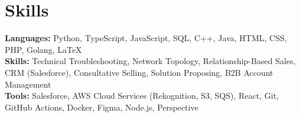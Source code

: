 \documentclass[11pt]{article}       %
\begin{document}

\vspace{-18.5pt}

\section*{Skills}
\textbf{Languages:} Python, TypeScript, JavaScript, SQL, C++, Java, HTML, CSS, PHP, Golang, LaTeX\\
\textbf{Skills:} Technical Troubleshooting, Network Topology, Relationship-Based Sales, CRM (Salesforce), Consultative Selling, Solution Proposing, B2B Account Management\\
\textbf{Tools:} Salesforce, AWS Cloud Services (Rekognition, S3, SQS), React, Git, GitHub Actions, Docker, Figma, Node.js, Perspective\\

\vspace{-6.5pt}
\end{document}
